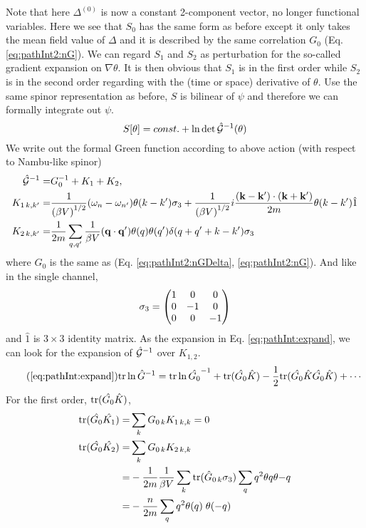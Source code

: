 Note that here $\Delta^{(0)}$ is now a constant 2-component vector, no longer functional variables.  Here we see that $S_{0}$ has the same form as before except it only takes the mean field value of $\Delta$ and it is described by the same correlation $G_{0}$ (Eq. \ref{eq:pathInt2:nG}).  We can regard $S_{1}$ and $S_{2}$ as perturbation for the so-called gradient expansion on $\nabla\theta$.  It is then obvious that $S_{1}$ is in the first order while $S_{2}$ is in the second order regarding with the (time or space) derivative of $\theta$.  Use the same spinor representation as before, $S$ is bilinear of $\psi$ and therefore we can formally integrate out $\psi$. 
\begin{equation}
S[\theta]=const.+\ln\det\hat{\mathcal{G}}^{-1}(\theta)
\end{equation}
 We write out the formal Green function according to above action (with respect to Nambu-like spinor)
\begin{subequations}
\begin{align}
\hat{\mathcal{G}}^{-1}=&G_{0}^{-1}+K_{1}+K_{2},\\
K_{1\, k,k'}=
	&\frac{1}{({\beta{}V)}^{1/2}}(\omega_n-\omega_{n'})\theta(k-k')\sigma_3+
		\frac{1}{{(\beta{}V)}^{1/2}}i\frac{(\mathbf{k}-\mathbf{k}')\cdot(\mathbf{k}+\mathbf{k}')}{2m}\theta(k-k')\hat{1}\\
K_{2\, k,k'}=
	&\frac{1}{2m}\sum_{q,q'}\frac{1}{{\beta{}V}}(\mathbf{q}\cdot\mathbf{q}')\theta(q)\theta(q')\delta(q+q'+k-k')\sigma_3
\end{align}
\end{subequations}
where $G_{0}$ is the same as (Eq. \eqref{eq:pathInt2:nGDelta}, \eqref{eq:pathInt2:nG}).  And like in the single channel, 
\begin{equation}
\sigma_3=\begin{pmatrix}1&0&0\\0&-1&0\\0&0&-1\end{pmatrix}
\end{equation}
and $\hat{1}$ is $3\times3$ identity matrix.  As the expansion in Eq. \ref{eq:pathInt:expand}, we can look for the expansion of $\hat{\mathcal{G}}^{-1}$ over $K_{1,2}$.  
\begin{equation}\tag{\ref{eq:pathInt:expand}}
\tr\ln \hat{G}^{-1}=\tr\ln\hat{G_{0}}^{-1}+\tr(\hat{G_{0}}\hat{K})-\nth{2}\tr(\hat{G_{0}}\hat{K}\hat{G_{0}}\hat{K})+\cdots
\end{equation}
For the first order, $\text{tr}(\hat{G_{0}}\hat{K})$, 
\begin{align}
\text{tr}(\hat{G_{0}}\hat{K_1})=&\sum_{k}{G_{0\,k}K_{1\,k,k}}=0\\
\text{tr}(\hat{G_{0}}\hat{K_2})=&\sum_{k}{G_{0\,k}K_{2\,k,k}}\nonumber\\
	=&-\frac{1}{2m}\frac{1}{{\beta{}V}}\sum_{k}\text{tr}(\hat{G}_{0\,k}\sigma_3)\sum_{q}q^2\theta{q}\theta{-q}\nonumber\\
	=&-\frac{n}{2m}\sum_{q}q^2\theta{(q)}\;\theta{(-q)}
\end{align}
